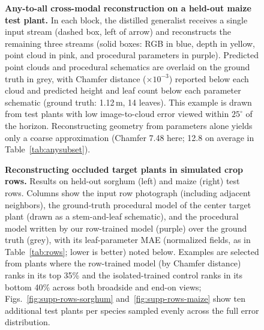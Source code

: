 \documentclass[10pt,twocolumn,letterpaper]{article}
\begin{document}
\begin{figure}[t]
  \centering
  \resizebox{\linewidth}{!}{}
  \caption{\textbf{Any-to-all cross-modal reconstruction on a held-out maize test plant.} In each block, the distilled generalist receives a single input stream (dashed box, left of arrow) and reconstructs the remaining three streams (solid boxes: RGB in blue, depth in yellow, point cloud in pink, and procedural parameters in purple). Predicted point clouds and procedural schematics are overlaid on the ground truth in grey, with Chamfer distance ($\times 10^{-3}$) reported below each cloud and predicted height and leaf count below each parameter schematic (ground truth: 1.12\,m, 14 leaves). This example is drawn from test plants with low image-to-cloud error viewed within $25^\circ$ of the horizon. Reconstructing geometry from parameters alone yields only a coarse approximation (Chamfer 7.48 here; 12.8 on average in Table~\ref{tab:anysubset}).}
  \label{fig:any2any-maize}\label{fig:any2any}
\end{figure}

\begin{figure}[t]
  \centering
  \resizebox{\linewidth}{!}{}
  \caption{\textbf{Reconstructing occluded target plants in simulated crop rows.} Results on held-out sorghum (left) and maize (right) test rows. Columns show the input row photograph (including adjacent neighbors), the ground-truth procedural model of the center target plant (drawn as a stem-and-leaf schematic), and the procedural model written by our row-trained model (purple) over the ground truth (grey), with its leaf-parameter MAE (normalized fields, as in Table~\ref{tab:rows}; lower is better) noted below. Examples are selected from plants where the row-trained model (by Chamfer distance) ranks in its top 35\% and the isolated-trained control ranks in its bottom 40\% across both broadside and end-on views; Figs.~\ref{fig:supp-rows-sorghum} and~\ref{fig:supp-rows-maize} show ten additional test plants per species sampled evenly across the full error distribution.}
  \label{fig:rowsex}
\end{figure}
\end{document}
